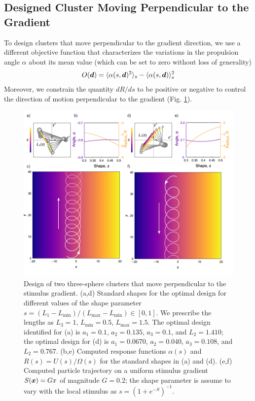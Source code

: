 \begin{appendices}
\clearpage
\section{Designed Cluster Moving Perpendicular to the Gradient}

To design clusters that move perpendicular to the gradient direction, we use a different objective function that characterizes the variations in the propulsion angle $\alpha$ about its mean value (which can be set to zero without loss of generality)
\begin{equation}
    O(\boldsymbol{d}) = \langle \alpha(s,\boldsymbol{d})^2 \rangle_s - \langle \alpha(s,\boldsymbol{d}) \rangle^2_s
\end{equation}
Moreover, we constrain the quantity $d R/d s$ to be positive or negative to control the direction of motion perpendicular to the gradient (Fig. \ref{fig:perpChemo}).

\begin{figure}[h]
    \centering
    \includegraphics[width=15cm]{figures/A3_FigureS4.pdf}
    \caption{Design of two three-sphere clusters that move perpendicular to the stimulus gradient. (a,d) Standard shapes for the optimal design for different values of the shape parameter $s=(L_1-L_{\min})/(L_{\max}-L_{\min})\in [0,1]$.
    We prescribe the lengths as $L_3=1$, $L_{\min}=0.5$, $L_{\max}=1.5$. The optimal design identified for (a) is $a_1=0.1$, $a_2=0.135$, $a_3=0.1$, and $L_2=1.410$; the optimal design for (d) is $a_1=0.0670$, $a_2=0.040$, $a_3=0.108$, and $L_2=0.767$. (b,e) Computed response functions $\alpha(s)$ and $R(s)=U(s)/\Omega(s)$ for the standard shapes in (a) and (d). (e,f) Computed particle trajectory on a uniform stimulus gradient $S(\boldsymbol{x})=Gx$ of magnitude $G=0.2$; the shape parameter is assume to vary with the local stimulus as $s = (1+ e^{-S})^{-1}$.}
    \label{fig:perpChemo}
\end{figure}




\end{appendices}
